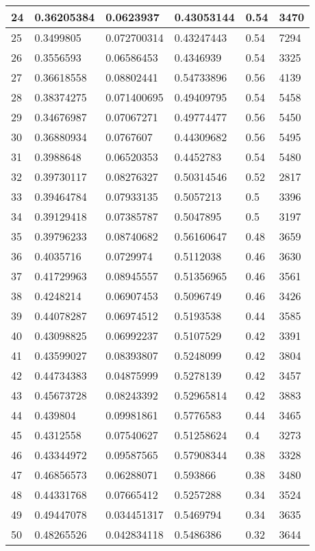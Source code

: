 \begin{longtable}{|l|l|l|l|l|l|}
24 & 0.36205384 & 0.0623937 & 0.43053144 & 0.54 & 3470 \\ \hline 
25 & 0.3499805 & 0.072700314 & 0.43247443 & 0.54 & 7294 \\ \hline 
26 & 0.3556593 & 0.06586453 & 0.4346939 & 0.54 & 3325 \\ \hline 
27 & 0.36618558 & 0.08802441 & 0.54733896 & 0.56 & 4139 \\ \hline 
28 & 0.38374275 & 0.071400695 & 0.49409795 & 0.54 & 5458 \\ \hline 
29 & 0.34676987 & 0.07067271 & 0.49774477 & 0.56 & 5450 \\ \hline 
30 & 0.36880934 & 0.0767607 & 0.44309682 & 0.56 & 5495 \\ \hline 
31 & 0.3988648 & 0.06520353 & 0.4452783 & 0.54 & 5480 \\ \hline 
32 & 0.39730117 & 0.08276327 & 0.50314546 & 0.52 & 2817 \\ \hline 
33 & 0.39464784 & 0.07933135 & 0.5057213 & 0.5 & 3396 \\ \hline 
34 & 0.39129418 & 0.07385787 & 0.5047895 & 0.5 & 3197 \\ \hline 
35 & 0.39796233 & 0.08740682 & 0.56160647 & 0.48 & 3659 \\ \hline 
36 & 0.4035716 & 0.0729974 & 0.5112038 & 0.46 & 3630 \\ \hline 
37 & 0.41729963 & 0.08945557 & 0.51356965 & 0.46 & 3561 \\ \hline 
38 & 0.4248214 & 0.06907453 & 0.5096749 & 0.46 & 3426 \\ \hline 
39 & 0.44078287 & 0.06974512 & 0.5193538 & 0.44 & 3585 \\ \hline 
40 & 0.43098825 & 0.06992237 & 0.5107529 & 0.42 & 3391 \\ \hline 
41 & 0.43599027 & 0.08393807 & 0.5248099 & 0.42 & 3804 \\ \hline 
42 & 0.44734383 & 0.04875999 & 0.5278139 & 0.42 & 3457 \\ \hline 
43 & 0.45673728 & 0.08243392 & 0.52965814 & 0.42 & 3883 \\ \hline 
44 & 0.439804 & 0.09981861 & 0.5776583 & 0.44 & 3465 \\ \hline 
45 & 0.4312558 & 0.07540627 & 0.51258624 & 0.4 & 3273 \\ \hline 
46 & 0.43344972 & 0.09587565 & 0.57908344 & 0.38 & 3328 \\ \hline 
47 & 0.46856573 & 0.06288071 & 0.593866 & 0.38 & 3480 \\ \hline 
48 & 0.44331768 & 0.07665412 & 0.5257288 & 0.34 & 3524 \\ \hline 
49 & 0.49447078 & 0.034451317 & 0.5469794 & 0.34 & 3635 \\ \hline 
50 & 0.48265526 & 0.042834118 & 0.5486386 & 0.32 & 3644 \\ \hline 
\end{longtable}